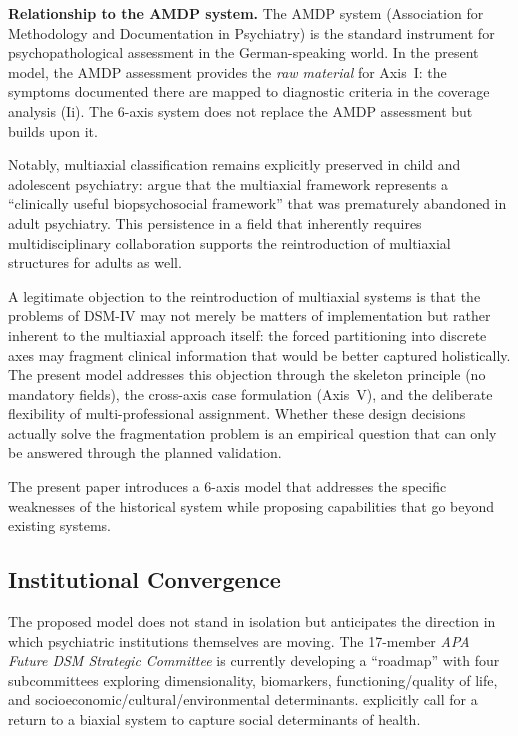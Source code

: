 \documentclass[11pt,a4paper]{article}
\begin{document}
\textbf{Relationship to the AMDP system.} The AMDP system (Association for Methodology and Documentation in Psychiatry) is the standard instrument for psychopathological assessment in the German-speaking world. In the present model, the AMDP assessment provides the \textit{raw material} for Axis~I: the symptoms documented there are mapped to diagnostic criteria in the coverage analysis (Ii). The 6-axis system does not replace the AMDP assessment but builds upon it.

Notably, multiaxial classification remains explicitly preserved in child and adolescent psychiatry: \citet{BJPsychAdv2024} argue that the multiaxial framework represents a ``clinically useful biopsychosocial framework'' that was prematurely abandoned in adult psychiatry. This persistence in a field that inherently requires multidisciplinary collaboration supports the reintroduction of multiaxial structures for adults as well.

A legitimate objection to the reintroduction of multiaxial systems is that the problems of DSM-IV may not merely be matters of implementation but rather inherent to the multiaxial approach itself: the forced partitioning into discrete axes may fragment clinical information that would be better captured holistically. The present model addresses this objection through the skeleton principle (no mandatory fields), the cross-axis case formulation (Axis~V), and the deliberate flexibility of multi-professional assignment. Whether these design decisions actually solve the fragmentation problem is an empirical question that can only be answered through the planned validation.

The present paper introduces a 6-axis model that addresses the specific weaknesses of the historical system while proposing capabilities that go beyond existing systems.

\subsection{Institutional Convergence}

The proposed model does not stand in isolation but anticipates the direction in which psychiatric institutions themselves are moving. The 17-member \textit{APA Future DSM Strategic Committee} is currently developing a ``roadmap'' with four subcommittees exploring dimensionality, biomarkers, functioning/quality of life, and socioeconomic/cultural/environmental determinants. \citet{ErlichFirst2025} explicitly call for a return to a biaxial system to capture social determinants of health.
\end{document}
